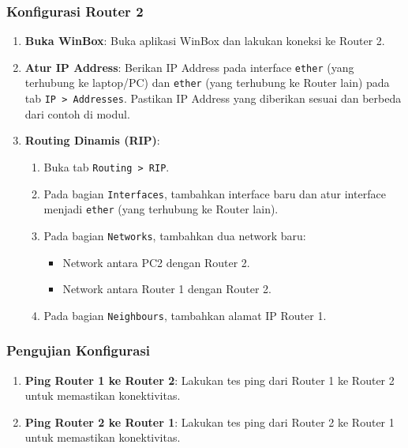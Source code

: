 \subsubsection*{Konfigurasi Router 2}

\begin{enumerate}
    \item \textbf{Buka WinBox}: Buka aplikasi WinBox dan lakukan koneksi ke Router 2.
    \item \textbf{Atur IP Address}: Berikan IP Address pada interface \texttt{ether} (yang terhubung ke laptop/PC) dan \texttt{ether} (yang terhubung ke Router lain) pada tab \texttt{IP > Addresses}. Pastikan IP Address yang diberikan sesuai dan berbeda dari contoh di modul.
    \item \textbf{Routing Dinamis (RIP)}:
    \begin{enumerate}
        \item Buka tab \texttt{Routing > RIP}.
        \item Pada bagian \texttt{Interfaces}, tambahkan interface baru dan atur interface menjadi \texttt{ether} (yang terhubung ke Router lain).
        \item Pada bagian \texttt{Networks}, tambahkan dua network baru:
        \begin{itemize}
            \item Network antara PC2 dengan Router 2.
            \item Network antara Router 1 dengan Router 2.
        \end{itemize}
        \item Pada bagian \texttt{Neighbours}, tambahkan alamat IP Router 1.
    \end{enumerate}
\end{enumerate}

\subsubsection*{Pengujian Konfigurasi}

\begin{enumerate}
    \item \textbf{Ping Router 1 ke Router 2}: Lakukan tes ping dari Router 1 ke Router 2 untuk memastikan konektivitas.
    \item \textbf{Ping Router 2 ke Router 1}: Lakukan tes ping dari Router 2 ke Router 1 untuk memastikan konektivitas.
\end{enumerate}